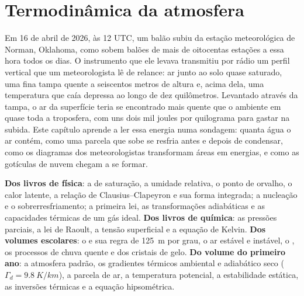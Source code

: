 \chapter{Termodinâmica da atmosfera}\label{ch:b2:atmospheric-thermodynamics}

Em 16 de abril de 2026, às 12 UTC, um balão subiu da estação meteorológica de Norman, Oklahoma, como
sobem balões de mais de oitocentas estações a essa hora todos os dias. O instrumento que ele
levava transmitiu por rádio um perfil vertical que um meteorologista lê de relance: ar junto ao solo
quase saturado, uma fina tampa quente a seiscentos metros de altura e, acima dela, uma temperatura que caía
depressa ao longo de dez quilômetros. Levantado através da tampa, o ar da superfície teria se encontrado
mais quente que o ambiente em quase toda a troposfera, com uns dois mil joules por
quilograma para gastar na subida. Este capítulo aprende a ler essa energia numa sondagem: quanta
água o ar contém, como uma parcela que sobe se resfria antes e depois de condensar, como os diagramas dos
meteorologistas transformam áreas em energias, e como as gotículas de nuvem chegam a se formar.

\begin{recall}
\textbf{Dos livros de física}: a  de saturação, a umidade relativa, o ponto de orvalho,
o calor latente, a relação de Clausius--Clapeyron e sua forma integrada; a nucleação e o
sobrerresfriamento; a primeira lei, as transformações adiabáticas e as capacidades térmicas de um gás ideal.
\textbf{Dos livros de química}: as pressões parciais, a lei de Raoult, a tensão superficial e a equação
de Kelvin. \textbf{Dos volumes escolares}: o  e sua regra de
\qty{125}{m} por grau, o ar estável e instável, o , os processos de chuva quente e
dos cristais de gelo. \textbf{Do volume do primeiro ano}: a atmosfera padrão, os gradientes térmicos
ambiental e adiabático seco ($\Gamma_d = \qty{9.8}{K/km}$), a parcela de ar, a temperatura
potencial, a estabilidade estática, as inversões térmicas e a equação hipsométrica.
\end{recall}

